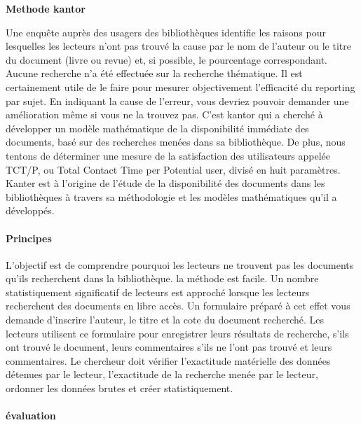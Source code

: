 \documentclass[french,a4paper,12pt]{article}
\begin{document}
\textbf{Methode kantor }

\quad Une enquête auprès des usagers des bibliothèques identifie les raisons pour lesquelles les lecteurs n'ont pas trouvé la cause par le nom de l'auteur ou le titre du document (livre ou revue) et, si possible, le pourcentage correspondant. Aucune recherche n'a été effectuée sur la recherche thématique.
Il est certainement utile de le faire pour mesurer objectivement l'efficacité du reporting par sujet. En indiquant la cause de l'erreur, vous devriez pouvoir demander une amélioration même si vous ne la trouvez pas. 
\quad C'est kantor qui a cherché à développer un modèle mathématique de la disponibilité immédiate des documents, basé sur des recherches menées dans sa bibliothèque. De plus, nous tentons de déterminer une mesure de la satisfaction des utilisateurs appelée TCT/P, ou Total Contact Time per Potential user, divisé en huit paramètres. Kanter est à l'origine de l'étude de la disponibilité des documents dans les bibliothèques à travers sa méthodologie et les modèles mathématiques qu'il a développés.

 \paragraph{Principes}  
 
 \quad L'objectif est de comprendre pourquoi les lecteurs ne trouvent pas les documents qu'ils recherchent dans la bibliothèque. la méthode est facile. Un nombre statistiquement significatif de lecteurs est approché lorsque les lecteurs recherchent des documents en libre accès. Un formulaire préparé à cet effet vous demande d'inscrire l'auteur, le titre et la cote du document recherché. Les lecteurs utilisent ce formulaire pour enregistrer leurs résultats de recherche, s'ils ont trouvé le document, leurs commentaires s'ils ne l'ont pas trouvé et leurs commentaires. Le chercheur doit vérifier l'exactitude matérielle des données détenues par le lecteur, l'exactitude de la recherche menée par le lecteur, ordonner les données brutes et créer statistiquement.
 
 \paragraph{évaluation}  
 
\end{document}
